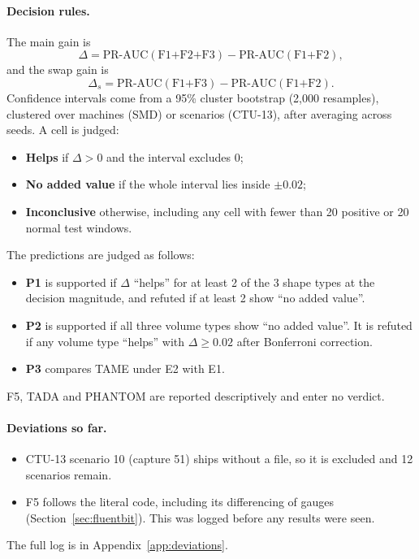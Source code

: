 \paragraph{Decision rules.} The main gain is
\[
  \Delta = \text{PR-AUC}(\text{F1+F2+F3}) - \text{PR-AUC}(\text{F1+F2}),
\]
and the swap gain is
\[
  \Delta_s = \text{PR-AUC}(\text{F1+F3}) - \text{PR-AUC}(\text{F1+F2}).
\]
Confidence intervals come from a 95\% cluster bootstrap (2{,}000 resamples), clustered over machines (SMD) or scenarios (CTU-13), after averaging across seeds. A cell is judged:
\begin{itemize}
  \item \textbf{Helps} if $\Delta>0$ and the interval excludes 0;
  \item \textbf{No added value} if the whole interval lies inside $\pm 0.02$;
  \item \textbf{Inconclusive} otherwise, including any cell with fewer than 20 positive or 20 normal test windows.
\end{itemize}
The predictions are judged as follows:
\begin{itemize}
  \item \textbf{P1} is supported if $\Delta$ ``helps'' for at least 2 of the 3 shape types at the decision magnitude, and refuted if at least 2 show ``no added value''.
  \item \textbf{P2} is supported if all three volume types show ``no added value''. It is refuted if any volume type ``helps'' with $\Delta \ge 0.02$ after Bonferroni correction.
  \item \textbf{P3} compares TAME under E2 with E1.
\end{itemize}
F5, TADA and PHANTOM are reported descriptively and enter no verdict.

\paragraph{Deviations so far.}
\begin{itemize}
  \item CTU-13 scenario 10 (capture 51) ships without a  file, so it is excluded and 12 scenarios remain.
  \item F5 follows the literal  code, including its differencing of gauges (Section~\ref{sec:fluentbit}). This was logged before any results were seen.
\end{itemize}
The full log is in Appendix~\ref{app:deviations}.
